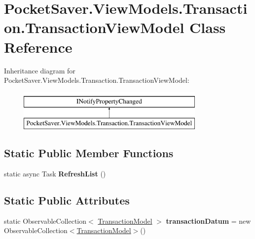 \hypertarget{class_pocket_saver_1_1_view_models_1_1_transaction_1_1_transaction_view_model}{}\section{Pocket\+Saver.\+View\+Models.\+Transaction.\+Transaction\+View\+Model Class Reference}
\label{class_pocket_saver_1_1_view_models_1_1_transaction_1_1_transaction_view_model}
Inheritance diagram for Pocket\+Saver.\+View\+Models.\+Transaction.\+Transaction\+View\+Model\+:\begin{figure}[H]
\begin{center}
\leavevmode
\includegraphics[height=2.000000cm]{class_pocket_saver_1_1_view_models_1_1_transaction_1_1_transaction_view_model}
\end{center}
\end{figure}
\subsection*{Static Public Member Functions}
\begin{DoxyCompactItemize}
\item 
\mbox{\label{class_pocket_saver_1_1_view_models_1_1_transaction_1_1_transaction_view_model_a18c3f058a5098c06cb7784ea7e5c8537}} 
static async Task {\bfseries Refresh\+List} ()
\end{DoxyCompactItemize}
\subsection*{Static Public Attributes}
\begin{DoxyCompactItemize}
\item 
\mbox{\label{class_pocket_saver_1_1_view_models_1_1_transaction_1_1_transaction_view_model_a5e19ca45b1a5803cbb1ab7b506ca9820}} 
static Observable\+Collection$<$ \hyperlink{class_pocket_saver_1_1_models_1_1_transaction_model}{Transaction\+Model} $>$ {\bfseries transaction\+Datum} = new Observable\+Collection$<$\hyperlink{class_pocket_saver_1_1_models_1_1_transaction_model}{Transaction\+Model}$>$()
\end{DoxyCompactItemize}
